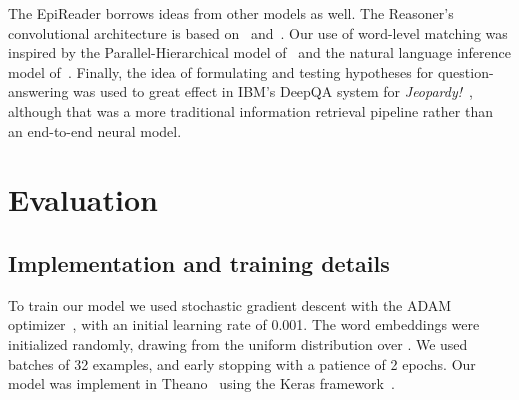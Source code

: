 \documentclass[11pt,letterpaper]{article}
\begin{document}
The EpiReader borrows ideas from other models as well. The Reasoner's convolutional architecture is based on~ and~. Our use of word-level matching was inspired by the Parallel-Hierarchical model of~ and the natural language inference model of~. Finally, the idea of formulating and testing hypotheses for question-answering was used to great effect in IBM's DeepQA system for {\it Jeopardy!}~\cite{ferrucci2010}, although that was a more traditional information retrieval pipeline rather than an end-to-end neural model.


\section{Evaluation}
\label{sec:res}
\subsection{Implementation and training details}
To train our model we used stochastic gradient descent with the ADAM optimizer~\cite{kingma2014}, with an initial learning rate of 0.001. The word embeddings were initialized randomly, drawing from the uniform distribution over . We used batches of 32 examples, and early stopping with a patience of 2 epochs. Our model was implement in Theano~\cite{theano10} using the Keras framework~\cite{keras}.
\end{document}
